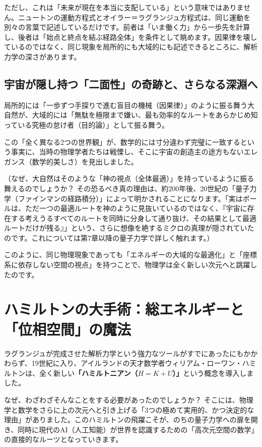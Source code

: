 ただし、これは「未来が現在を本当に支配している」という意味ではありません。ニュートンの運動方程式とオイラー＝ラグランジュ方程式は、同じ運動を別々の言葉で記述しているだけです。前者は「いま働く力」から一歩先を計算し、後者は「始点と終点を結ぶ経路全体」を条件として眺めます。因果律を壊しているのではなく、同じ現象を局所的にも大域的にも記述できるところに、解析力学の深さがあります。

\subsection{宇宙が隠し持つ「二面性」の奇跡と、さらなる深淵へ}

局所的には「一歩ずつ手探りで進む盲目の機械（因果律）」のように振る舞う大自然が、大域的には「無駄を極限まで嫌い、最も効率的なルートをあらかじめ知っている究極の怠け者（目的論）」として振る舞う。

この「全く異なる2つの世界観」が、数学的には寸分違わず完璧に一致するという事実に、当時の物理学者たちは戦慄し、そこに宇宙の創造主の途方もないエレガンス（数学的美しさ）を見出しました。

（なぜ、大自然はそのような「神の視点（全体最適）」を持っているように振る舞えるのでしょうか？ その恐るべき真の理由は、約200年後、20世紀の「量子力学（ファインマンの経路積分）」によって明かされることになります。「実はボールは、ただ一つの最適ルートを神のように見抜いているのではなく、『宇宙に存在する考えうるすべてのルートを同時に分身して通り抜け、その結果として最適ルートだけが残る』」という、さらに想像を絶するミクロの真理が隠されていたのです。これについては第7章以降の量子力学で詳しく触れます。）

このように、同じ物理現象であっても「エネルギーの大域的な最適化」と「座標系に依存しない空間の視点」を持つことで、物理学は全く新しい次元へと跳躍したのです。

\section{ハミルトンの大手術：総エネルギーと「位相空間」の魔法}

ラグランジュが完成させた解析力学という強力なツールがすでにあったにもかかわらず、19世紀に入り、アイルランドの天才数学者ウィリアム・ローワン・ハミルトンは、全く新しい\textbf{「ハミルトニアン（\(H=K+U\)）」}という概念を導入しました。

なぜ、わざわざそんなことをする必要があったのでしょうか？ そこには、物理学と数学をさらに上の次元へと引き上げる「3つの極めて実用的、かつ決定的な理由」がありました。このハミルトンの飛躍こそが、のちの量子力学への扉を開き、同時に現代のAI（人工知能）が世界を認識するための「高次元空間の数学」の直接的なルーツとなっていきます。

